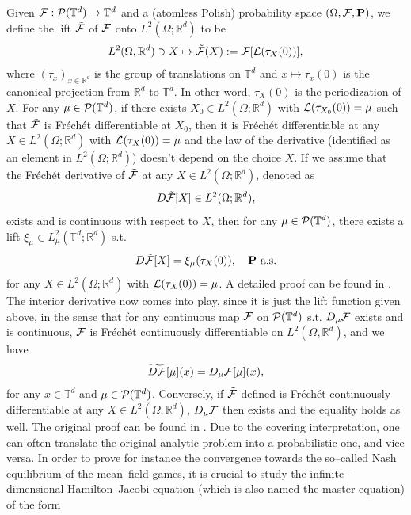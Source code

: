 Given $\mathcal{F}: \mathcal{P}(\mathbb{T}^d) \to \mathbb{T}^d$ and a (atomless Polish) probability space $(\Omega, \mathcal{F}, \mathbf{P})$, we define the lift $\tilde{\mathcal{F}}$ of $\mathcal{F}$ onto $L^2(\Omega; \mathbb{R}^d)$ to be 
\begin{align*}
L^2(\Omega, \mathbb{R}^d) \ni X \mapsto \tilde{\mathcal{F}}(X) := \mathcal{F}[\mathcal{L}(\tau_X(0))],
\end{align*}
where $(\tau_x)_{x\in\mathbb{R}^d}$ is the group of translations on $\mathbb{T}^d$ and $x \mapsto \tau_x(0)$ is the canonical projection from $\mathbb{R}^d$ to $\mathbb{T}^d$. In other word, $\tau_X(0)$ is the periodization of $X$. For any $\mu \in \mathcal{P}(\mathbb{T}^d)$, if there exists $X_0 \in L^2(\Omega; \mathbb{R}^d)$ with $\mathcal{L}(\tau_{X_0}(0)) = \mu$ such that $\tilde{\mathcal{F}}$ is Fr\'ech\'et differentiable at $X_0$, then it is Fr\'ech\'et differentiable at any $X \in L^2(\Omega; \mathbb{R}^d)$ with $\mathcal{L}(\tau_X(0)) = \mu$ and the law of the derivative (identified as an element in $L^2(\Omega; \mathbb{R}^d)$) doesn't depend on the choice $X$. If we assume that the Fr\'ech\'et derivative of $\tilde{\mathcal{F}}$ at any $X \in L^2(\Omega; \mathbb{R}^d)$, denoted as 
$$
D\tilde{\mathcal{F}}[X] \in L^2(\Omega; \mathbb{R}^d),
$$
exists and is continuous with respect to $X$, then for any $\mu \in \mathcal{P}(\mathbb{T}^d)$, there exists a lift $\xi_{\mu} \in L^2_{\mu}(\mathbb{T}^d; \mathbb{R}^d)$ s.t. 
$$
 D\tilde{\mathcal{F}}[X] = \xi_{\mu}(\tau_X(0)), \quad \mathbf{P} \ \text{a.s.}
 $$
for any $X \in L^2(\Omega; \mathbb{R}^d)$ with $\mathcal{L}(\tau_X(0)) = \mu$. A detailed proof can be found in \cite{C10}. The interior derivative now comes into play, since it is just the lift function given above, in the sense that for any continuous map $\mathcal{F}$ on $\mathcal{P}(\mathbb{T}^d)$ s.t. $D_{\mu}\mathcal{F}$ exists and is continuous, $\tilde{\mathcal{F}}$ is Fr\'ech\'et continuously differentiable on $L^2(\Omega, \mathbb{R}^d)$, and we have
\begin{align*}
\widetilde{D\mathcal{F}}[\mu](x) = D_{\mu}\mathcal{F}[\mu](x),
\end{align*}
for any $x \in \mathbb{T}^d$ and $\mu \in \mathcal{P}(\mathbb{T}^d)$. Conversely, if $\tilde{\mathcal{F}}$
defined is Fr\'ech\'et continuously differentiable at any $X \in L^2(\Omega, \mathbb{R}^d)$, $D_{\mu}\mathcal{F}$ then exists and the equality holds as well. The original proof can be found in \cite{CDLL19}. Due to the covering interpretation, one can often translate the original analytic problem into a probabilistic one, and vice versa. In order to prove for instance the convergence towards the so--called Nash equilibrium of the mean--field games, it is crucial to study the infinite--dimensional Hamilton--Jacobi equation (which is also named the master equation) of the form
